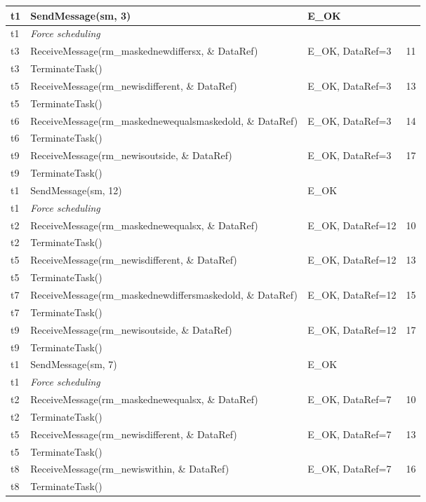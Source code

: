 \documentclass[10pt]{article}
\newlength{\Li}\settowidth{\Li}{Running}
\newlength{\Lii}\setlength{\Lii}{7cm}
\newlength{\Liiii}\setlength{\Liiii}{0.9cm}
\newlength{\Liii}\setlength{\Liii}{\textwidth} \addtolength{\Liii}{-\Li} \addtolength{\Liii}{-\Lii} \addtolength{\Liii}{-\Liiii}
\begin{document}
	\begin{supertabular}{|p{\Li}|p{\Lii}|p{\Liii}|p{\Liiii}|} \hline 
	t1	& SendMessage(sm, 3)										& E\_OK				& \\ \hline
	t1	& \textit{Force scheduling}									& 					& \\ \hline
	t3	& ReceiveMessage(rm\_maskednewdiffersx, \& DataRef)				& E\_OK, DataRef=3		& 11\\ \hline
	t3	& TerminateTask()											& 					&\\ \hline	
	t5	& ReceiveMessage(rm\_newisdifferent, \& DataRef)					& E\_OK, DataRef=3		& 13 \\ \hline
	t5	& TerminateTask()											& 					&\\ \hline
	t6	& ReceiveMessage(rm\_maskednewequalsmaskedold, \& DataRef)	& E\_OK, DataRef=3		& 14 \\ \hline
	t6	& TerminateTask()											& 					&\\ \hline
	t9	& ReceiveMessage(rm\_newisoutside, \& DataRef)					& E\_OK, DataRef=3		& 17 \\ \hline
	t9	& TerminateTask()											& 					&\\ \hline
	
	t1	& SendMessage(sm, 12)										& E\_OK				&\\ \hline
	t1	& \textit{Force scheduling}									& 					&\\ \hline
	t2	& ReceiveMessage(rm\_maskednewequalsx, \& DataRef)			& E\_OK, DataRef=12	& 10 \\ \hline
	t2	& TerminateTask()											& 					&\\ \hline
	t5	& ReceiveMessage(rm\_newisdifferent, \& DataRef)					& E\_OK, DataRef=12	& 13 \\ \hline
	t5	& TerminateTask()											& 					&\\ \hline
	t7	& ReceiveMessage(rm\_maskednewdiffersmaskedold, \& DataRef)		& E\_OK, DataRef=12	& 15  \\ \hline
	t7	& TerminateTask()											& 					&\\ \hline	
	t9	& ReceiveMessage(rm\_newisoutside, \& DataRef)					& E\_OK, DataRef=12	& 17 \\ \hline
	t9	& TerminateTask()											& 					&\\ \hline
	
	t1	& SendMessage(sm, 7)										& E\_OK				& \\ \hline
	t1	& \textit{Force scheduling}									& 					& \\ \hline
	t2	& ReceiveMessage(rm\_maskednewequalsx, \& DataRef)			& E\_OK, DataRef=7		& 10 \\ \hline
	t2	& TerminateTask()											& 					&\\ \hline
	t5	& ReceiveMessage(rm\_newisdifferent, \& DataRef)					& E\_OK, DataRef=7		& 13 \\ \hline
	t5	& TerminateTask()											& 					&\\ \hline
	t8	& ReceiveMessage(rm\_newiswithin, \& DataRef)					& E\_OK, DataRef=7		& 16 \\ \hline
	t8	& TerminateTask()											& 					&\\ \hline
	

\end{supertabular}
\end{document}
